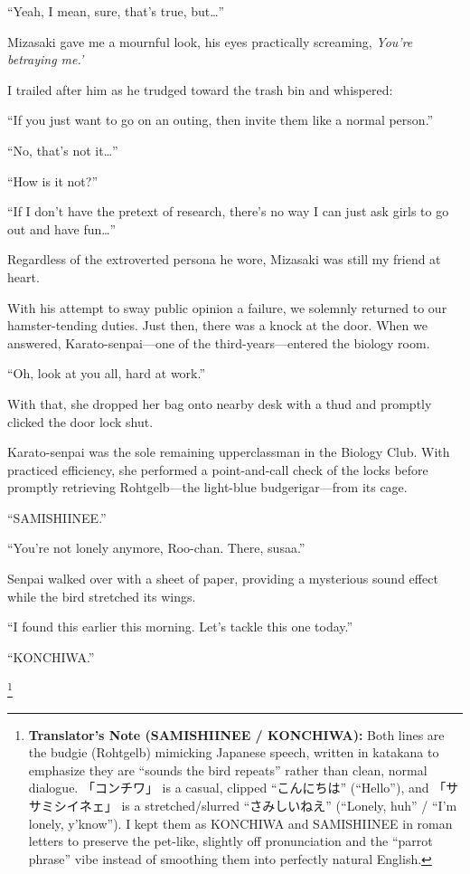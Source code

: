 \documentclass[
    a4paper,
    12pt,
    twoside,
    openany,
    UTF8,
    fontset=windows
]{ctexbook}
\begin{document}
``Yeah, I mean, sure, that's true, but\dots''

Mizasaki gave me a mournful look, his eyes practically screaming, \textit{You're betraying me.'}

I trailed after him as he trudged toward the trash bin and whispered:

``If you just want to go on an outing, then invite them like a normal person.''

``No, that's not it\dots''

``How is it not?''

``If I don't have the pretext of research, there's no way I can just ask girls to go out and have fun\dots''

Regardless of the extroverted persona he wore, Mizasaki was still my friend at heart.

With his attempt to sway public opinion a failure, we solemnly returned to our hamster-tending duties. Just then, there was a knock at the door. When we answered, Karato-senpai---one of the third-years---entered the biology room.

``Oh, look at you all, hard at work.''

With that, she dropped her bag onto nearby desk with a thud and promptly clicked the door lock shut.

Karato-senpai was the sole remaining upperclassman in the Biology Club. With practiced efficiency, she performed a point-and-call check of the locks before promptly retrieving Rohtgelb---the light-blue budgerigar---from its cage.

``SAMISHIINEE.''

``You're not lonely anymore, Roo-chan. There, susaa.''

Senpai walked over with a sheet of paper, providing a mysterious sound effect while the bird stretched its wings.

``I found this earlier this morning. Let's tackle this one today.''

``KONCHIWA.''

\footnote{\textbf{Translator's Note (SAMISHIINEE / KONCHIWA):} Both lines are the budgie (Rohtgelb) mimicking Japanese speech, written in katakana to emphasize they are ``sounds the bird repeats'' rather than clean, normal dialogue. 「コンチワ」 is a casual, clipped ``こんにちは'' (``Hello''), and 「ササミシイネェ」 is a stretched/slurred ``さみしいねえ'' (``Lonely, huh'' / ``I'm lonely, y'know''). I kept them as KONCHIWA and SAMISHIINEE in roman letters to preserve the pet-like, slightly off pronunciation and the ``parrot phrase'' vibe instead of smoothing them into perfectly natural English.}
\end{document}
